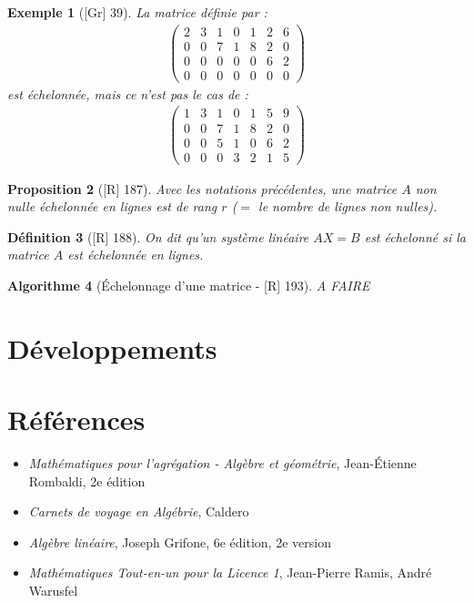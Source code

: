 \documentclass[10pt, a4paper, parskip=full, twoside, twocolumn]{report}
\newtheorem{definition}{Définition}
\newtheorem{proposition}[definition]{Proposition}
\newtheorem{example}[definition]{Exemple}
\newtheorem{algorithm}[definition]{Algorithme}
\begin{document}
\begin{example}[\textnormal{[Gr] 39}]
	La matrice définie par :
	\begin{align*}
		\begin{pmatrix}
			2&3&1&0&1&2&6 \\
			0&0&7&1&8&2&0 \\
			0&0&0&0&0&6&2 \\
			0&0&0&0&0&0&0
		\end{pmatrix}
	\end{align*}
	est échelonnée, mais ce n'est pas le cas de :
	\begin{align*}
		\begin{pmatrix}
			1&3&1&0&1&5&9 \\
			0&0&7&1&8&2&0 \\
			0&0&5&1&0&6&2 \\
			0&0&0&3&2&1&5
		\end{pmatrix}
	\end{align*}
\end{example}

\begin{proposition}[\textnormal{[R] 187}]
	Avec les notations précédentes, une matrice $A$ non nulle échelonnée en lignes est de rang $r$ ($=$ le nombre de lignes non nulles).
\end{proposition}

\begin{definition}[\textnormal{[R] 188}]
	On dit qu'un système linéaire $AX = B$ est \emph{échelonné} si la matrice $A$ est échelonnée en lignes.
\end{definition}

\begin{algorithm}[Échelonnage d'une matrice - \textnormal{[R] 193}]
	A FAIRE
\end{algorithm}


\section*{Développements}

\section*{Références}
\begin{itemize}
	\item[R] \emph{Mathématiques pour l'agrégation - Algèbre et géométrie}, Jean-Étienne Rombaldi, 2e édition
	\item[C] \emph{Carnets de voyage en Algébrie}, Caldero
	\item[Gr] \emph{Algèbre linéaire}, Joseph Grifone, 6e édition, 2e version
	\item[TL1] \emph{Mathématiques Tout-en-un pour la Licence 1}, Jean-Pierre Ramis, André Warusfel
\end{itemize}
\end{document}
